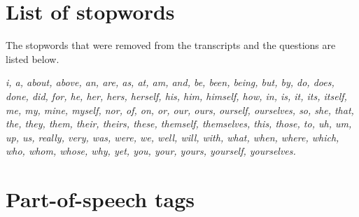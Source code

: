 \section{List of stopwords}
The stopwords that were removed from the transcripts and the questions are listed below. 

\small 
\textit{i, a, about, above, an, are, as, at, am, and, be, been, being, but, by, do, does, done, did, for, he, her, hers, herself, his, him, himself, how, in, is, it, its, itself, me, my, mine, myself, nor, of, on, or, our, ours, ourself, ourselves, so, she, that, the, they, them, their, theirs, these, themself, themselves, this, those, to, uh, um, up, us, really, very, was, were, we, well, will, with, what, when, where, which, who, whom, whose, why, yet, you, your, yours, yourself, yourselves.
}
\normalsize

\pagebreak

\section{Part-of-speech tags}

